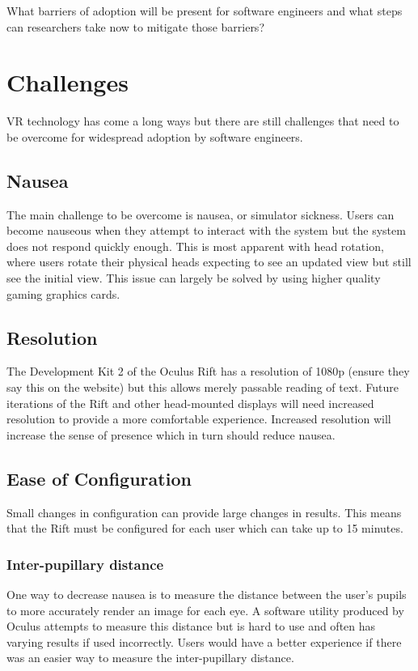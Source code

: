 \documentclass[conference]{IEEEtran}
\begin{document}
What barriers of adoption will be present for software engineers and what steps can researchers take now to mitigate those barriers?

\section{Challenges}
VR technology has come a long ways but there are still challenges that need to be overcome for widespread adoption by software engineers.

\subsection{Nausea}
The main challenge to be overcome is nausea, or simulator sickness.
Users can become nauseous when they attempt to interact with the system but the system does not respond quickly enough.
This is most apparent with head rotation, where users rotate their physical heads expecting to see an updated view but still see the initial view.
This issue can largely be solved by using higher quality gaming graphics cards.

\subsection{Resolution}
The Development Kit 2 of the Oculus Rift has a resolution of 1080p (ensure they say this on the website) but this allows merely passable reading of text. 
Future iterations of the Rift and other head-mounted displays will need increased resolution to provide a more comfortable experience.
Increased resolution will increase the sense of presence which in turn should reduce nausea.

\subsection{Ease of Configuration}
Small changes in configuration can provide large changes in results.
This means that the Rift must be configured for each user which can take up to 15 minutes.

\subsubsection{Inter-pupillary distance}
One way to decrease nausea is to measure the distance between the user's pupils to more accurately render an image for each eye.
A software utility produced by Oculus attempts to measure this distance but is hard to use and often has varying results if used incorrectly.
Users would have a better experience if there was an easier way to measure the inter-pupillary distance.
\end{document}
